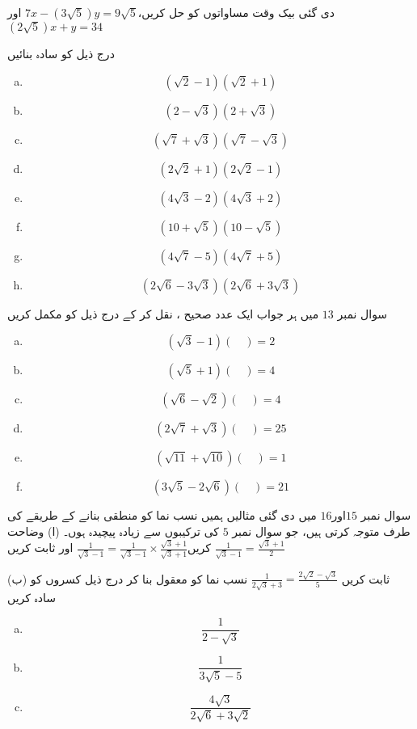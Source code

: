 دی گئی بیک وقت مساواتوں کو حل کریں،\(7x-(3\sqrt{5})y=9\sqrt{5}\) اور \((2\sqrt{5})x+y=34\)

درج ذیل کو سادہ بنائیں

\begin{multicols}{3}
\begin{enumerate}[a.]
\item
\[(\sqrt{2}-1)(\sqrt{2}+1)\]
\item
\[(2-\sqrt{3})(2+\sqrt{3})\]
\item
\[(\sqrt{7}+\sqrt{3})(\sqrt{7}-\sqrt{3})\]
\item
\[(2\sqrt{2}+1)(2\sqrt{2}-1)\]
\item
\[(4\sqrt{3}-2)(4\sqrt{3}+2)\]
\item
\[(10+\sqrt{5})(10-\sqrt{5})\]
\item
\[(4\sqrt{7}-5)(4\sqrt{7}+5)\]
\item
\[(2\sqrt{6}-3\sqrt{3})(2\sqrt{6}+3\sqrt{3})\]
\end{enumerate}
\end{multicols}
سوال نمبر \(13\) میں ہر جواب ایک عدد صحیح ، نقل کر کے درج ذیل کو مکمل کریں
\begin{multicols}{2}
\begin{enumerate}[a.]
\item
\[(\sqrt{3}-1)(\quad )=2\]
\item
\[(\sqrt{5}+1)(\quad)=4\]
\item
\[(\sqrt{6}-\sqrt{2})(\quad)=4\]
\item
\[(2\sqrt{7}+\sqrt{3})(\quad)=25\]
\item
\[(\sqrt{11}+\sqrt{10})(\quad)=1\]
\item
\[(3\sqrt{5}-2\sqrt{6})(\quad)=21\]
\end{enumerate}
\end{multicols}
سوال نمبر \(15\)اور\(16\) میں دی گئی مثالیں ہمیں نسب نما کو منطقی بنانے کے طریقے کی طرف متوجہ کرتی ہیں، جو سوال نمبر \(5\) کی ترکیبوں سے زیادہ پیچیدہ ہوں۔
(ا) وضاحت کریں\(\frac{1}{\sqrt{3}-1}=\frac{1}{\sqrt{3}-1}\times\frac{\sqrt{3}+1}{\sqrt{3}+1}\) اور ثابت کریں \(\frac{1}{\sqrt{3}-1}=\frac{\sqrt{3}+1}{2}\)

(ب) ثابت کریں \(\frac{1}{2\sqrt{3}+3}=\frac{2\sqrt{2}-\sqrt{3}}{5}\)
نسب نما کو معقول بنا کر درج ذیل کسروں کو سادہ کریں
\begin{multicols}{3}
\begin{enumerate}[a.]
\item
\[\frac{1}{2-\sqrt{3}}\]
\item
\[\frac{1}{3\sqrt{5}-5}\]
\item
\[\frac{4\sqrt{3}}{2\sqrt{6}+3\sqrt{2}}\]
\end{enumerate}
\end{multicols}

